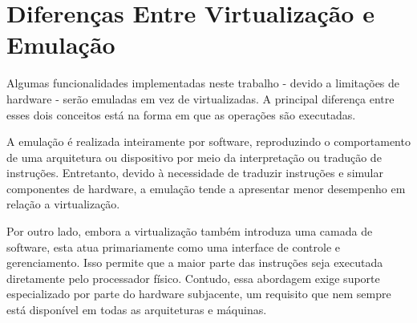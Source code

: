 \section{Diferenças Entre Virtualização e Emulação}

Algumas funcionalidades implementadas neste trabalho - devido a limitações de hardware - serão emuladas em vez de virtualizadas.
A principal diferença entre esses dois conceitos está na forma em que as operações são executadas.

A emulação é realizada inteiramente por software, reproduzindo o comportamento de uma arquitetura ou dispositivo por meio da interpretação ou tradução
de instruções. Entretanto, devido à necessidade de traduzir instruções e simular componentes de hardware, a emulação tende a apresentar menor desempenho
em relação a virtualização.

Por outro lado, embora a virtualização também introduza uma camada de software, esta atua primariamente como uma interface de controle e gerenciamento.
Isso permite que a maior parte das instruções seja executada diretamente pelo processador físico. Contudo, essa abordagem exige suporte especializado
por parte do hardware subjacente, um requisito que nem sempre está disponível em todas as arquiteturas e máquinas.
